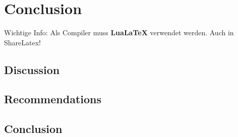 \chapter{Conclusion}
\label{ch:grundlagen}

Wichtige Info: Als Compiler muss \textbf{LuaLaTeX} verwendet werden. Auch in ShareLatex!

\section{Discussion}
\section{Recommendations}
\section{Conclusion}